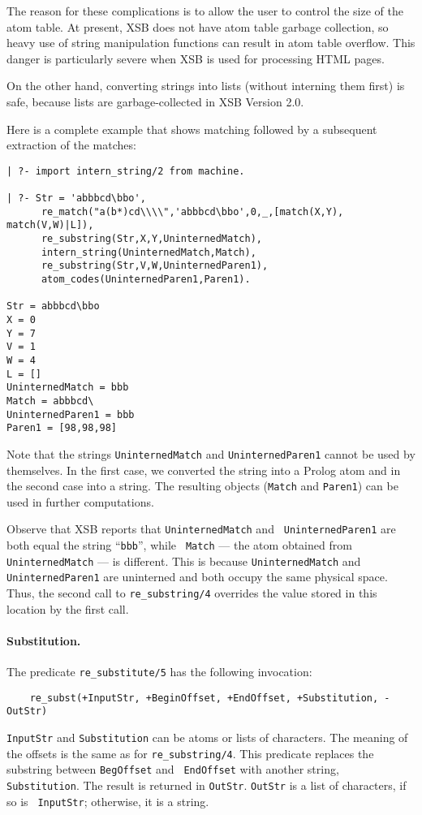 The reason for these complications is to allow the user to control the size
of the atom table. At present, XSB does not have atom table garbage
collection, so heavy use of string manipulation functions can result in
atom table overflow. This danger is particularly severe when XSB is used
for processing HTML pages.

On the other hand, converting strings into lists (without interning them
first) is safe, because lists are garbage-collected in XSB Version 2.0.

Here is a complete example that shows matching followed by a subsequent 
extraction of the matches:
\begin{verbatim}
| ?- import intern_string/2 from machine.

| ?- Str = 'abbbcd\bbo',
      re_match("a(b*)cd\\\\",'abbbcd\bbo',0,_,[match(X,Y), match(V,W)|L]),
      re_substring(Str,X,Y,UninternedMatch),
      intern_string(UninternedMatch,Match),
      re_substring(Str,V,W,UninternedParen1),
      atom_codes(UninternedParen1,Paren1).

Str = abbbcd\bbo
X = 0
Y = 7
V = 1
W = 4
L = []
UninternedMatch = bbb
Match = abbbcd\
UninternedParen1 = bbb
Paren1 = [98,98,98]
\end{verbatim}
Note that the strings {\tt UninternedMatch} and {\tt UninternedParen1}
cannot be used by themselves. In the first case, we converted the string
into a Prolog atom and in the second case into a string. The resulting
objects ({\tt Match} and {\tt Paren1}) can be used in further computations.

Observe that XSB reports that {\tt UninternedMatch} and {\tt
UninternedParen1} are both equal the string ``{\tt bbb}'', while {\tt
Match} --- the atom obtained from {\tt UninternedMatch} --- is different.
This is because {\tt UninternedMatch} and {\tt UninternedParen1} are
uninterned and both occupy the same physical space. Thus, the second call
to \verb|re_substring/4| overrides the value stored in this location by the
first call.

\paragraph{Substitution.}
The predicate \verb|re_substitute/5| has the following invocation:
\begin{verbatim}
    re_subst(+InputStr, +BeginOffset, +EndOffset, +Substitution, -OutStr)  
\end{verbatim}
{\tt InputStr} and {\tt Substitution} can be atoms or lists of characters.
The meaning of the offsets is the same as for {\tt re\_substring/4}.
This predicate replaces the substring between {\tt BegOffset} and {\tt
EndOffset} with another string, {\tt Substitution}. The result is returned
in {\tt OutStr}. {\tt OutStr} is a list of characters, if so is {\tt
InputStr}; otherwise, it is a string.

